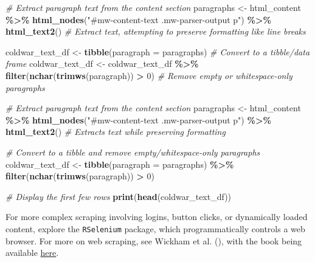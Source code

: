 \documentclass[
]{book}
\newenvironment{Shaded}{\begin{snugshade}}{\end{snugshade}}
\newcommand{\AttributeTok}[1]{\textcolor[rgb]{0.13,0.29,0.53}{#1}}
\newcommand{\CommentTok}[1]{\textcolor[rgb]{0.56,0.35,0.01}{\textit{#1}}}
\newcommand{\DecValTok}[1]{\textcolor[rgb]{0.00,0.00,0.81}{#1}}
\newcommand{\FunctionTok}[1]{\textcolor[rgb]{0.13,0.29,0.53}{\textbf{#1}}}
\newcommand{\NormalTok}[1]{#1}
\newcommand{\OtherTok}[1]{\textcolor[rgb]{0.56,0.35,0.01}{#1}}
\newcommand{\SpecialCharTok}[1]{\textcolor[rgb]{0.81,0.36,0.00}{\textbf{#1}}}
\newcommand{\StringTok}[1]{\textcolor[rgb]{0.31,0.60,0.02}{#1}}
\begin{document}
\begin{Shaded}
\begin{Highlighting}[]
\CommentTok{\# Extract paragraph text from the content section}
\NormalTok{paragraphs }\OtherTok{\textless{}{-}}\NormalTok{ html\_content }\SpecialCharTok{\%\textgreater{}\%}
    \FunctionTok{html\_nodes}\NormalTok{(}\StringTok{"\#mw{-}content{-}text .mw{-}parser{-}output p"}\NormalTok{) }\SpecialCharTok{\%\textgreater{}\%}
    \FunctionTok{html\_text2}\NormalTok{()  }\CommentTok{\# Extract text, attempting to preserve formatting like line breaks}

\NormalTok{coldwar\_text\_df }\OtherTok{\textless{}{-}} \FunctionTok{tibble}\NormalTok{(}\AttributeTok{paragraph =}\NormalTok{ paragraphs)  }\CommentTok{\# Convert to a tibble/data frame}
\NormalTok{coldwar\_text\_df }\OtherTok{\textless{}{-}}\NormalTok{ coldwar\_text\_df }\SpecialCharTok{\%\textgreater{}\%}
    \FunctionTok{filter}\NormalTok{(}\FunctionTok{nchar}\NormalTok{(}\FunctionTok{trimws}\NormalTok{(paragraph)) }\SpecialCharTok{\textgreater{}} \DecValTok{0}\NormalTok{)  }\CommentTok{\# Remove empty or whitespace{-}only paragraphs}

\CommentTok{\# Extract paragraph text from the content section}
\NormalTok{paragraphs }\OtherTok{\textless{}{-}}\NormalTok{ html\_content }\SpecialCharTok{\%\textgreater{}\%}
    \FunctionTok{html\_nodes}\NormalTok{(}\StringTok{"\#mw{-}content{-}text .mw{-}parser{-}output p"}\NormalTok{) }\SpecialCharTok{\%\textgreater{}\%}
    \FunctionTok{html\_text2}\NormalTok{()  }\CommentTok{\# Extracts text while preserving formatting}

\CommentTok{\# Convert to a tibble and remove empty/whitespace{-}only paragraphs}
\NormalTok{coldwar\_text\_df }\OtherTok{\textless{}{-}} \FunctionTok{tibble}\NormalTok{(}\AttributeTok{paragraph =}\NormalTok{ paragraphs) }\SpecialCharTok{\%\textgreater{}\%}
    \FunctionTok{filter}\NormalTok{(}\FunctionTok{nchar}\NormalTok{(}\FunctionTok{trimws}\NormalTok{(paragraph)) }\SpecialCharTok{\textgreater{}} \DecValTok{0}\NormalTok{)}

\CommentTok{\# Display the first few rows}
\FunctionTok{print}\NormalTok{(}\FunctionTok{head}\NormalTok{(coldwar\_text\_df))}
\end{Highlighting}
\end{Shaded}

For more complex scraping involving logins, button clicks, or dynamically loaded content, explore the \texttt{RSelenium} package, which programmatically controls a web browser. For more on web scraping, see Wickham et al. (), with the book being available \href{https://r4ds.hadley.nz/webscraping.html}{here}.
\end{document}
